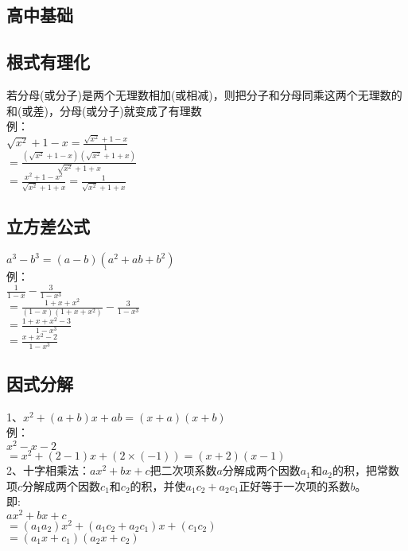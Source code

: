 \documentclass{article}
\begin{document}
\begin{flushleft}
	\LARGE
	
	\section{高中基础}
	
	\subsection{根式有理化}
	若分母(或分子)是两个无理数相加(或相减)，则把分子和分母同乘这两个无理数的和(或差)，分母(或分子)就变成了有理数\\
	例：\\
	\qquad $\sqrt{x^2}+1-x=\frac{\sqrt{x^2}+1-x}{1}$\\
	\qquad $=\frac{(\sqrt{x^2}+1-x)(\sqrt{x^2}+1+x)}{\sqrt{x^2}+1+x}$\\
	\qquad $=\frac{x^2+1-x^2}{\sqrt{x^2}+1+x}=\frac{1}{\sqrt{x^2}+1+x}$\\
	
	\subsection{立方差公式}
	$a^3-b^3=(a-b)(a^2+ab+b^2)$\\
	例：\\
	\qquad $\frac{1}{1-x}-\frac{3}{1-x^3}$\\
	\qquad $=\frac{1+x+x^2}{(1-x)(1+x+x^2)}-\frac{3}{1-x^3}$\\
	\qquad $=\frac{1+x+x^2-3}{1-x^3}$\\
	\qquad $=\frac{x+x^2-2}{1-x^3}$\\
	
	\subsection{因式分解}
	1、$x^2+(a+b)x+ab=(x+a)(x+b)$\\
	例：\\
	\qquad $x^2-x-2$\\
	\qquad $=x^2+(2-1)x+(2\times(-1))=(x+2)(x-1)$\\
	2、十字相乘法：$ax^2+bx+c$把二次项系数$a$分解成两个因数$a_1$和$a_2$的积，把常数项$c$分解成两个因数$c_1$和$c_2$的积，并使$a_1c_2+a_2c_1$正好等于一次项的系数$b$。\\
	即:\\
	\qquad $ax^2+bx+c$\\
	\qquad $=(a_1a_2)x^2+(a_1c_2+a_2c_1)x+(c_1c_2)$\\
	\qquad $=(a_1x+c_1)(a_2x+c_2)$\\
	

\end{flushleft}
\end{document}
